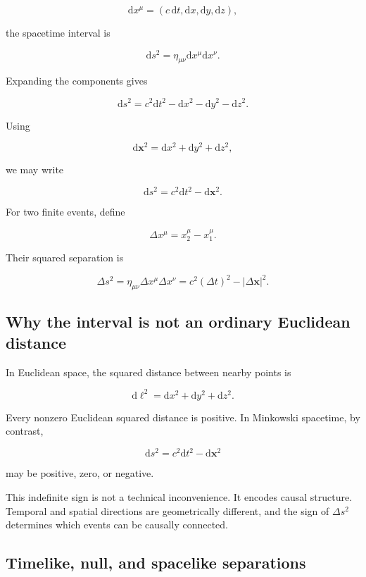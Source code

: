 \[
\mathrm{d}x^{\mu}
=
(c\,\mathrm{d}t,\mathrm{d}x,\mathrm{d}y,\mathrm{d}z),
\]

the spacetime interval is

\[
\boxed{
\mathrm{d}s^{2}
=
\eta_{\mu\nu}
\mathrm{d}x^{\mu}
\mathrm{d}x^{\nu}
}.
\]

Expanding the components gives

\[
\boxed{
\mathrm{d}s^{2}
=
c^{2}\mathrm{d}t^{2}
-
\mathrm{d}x^{2}
-
\mathrm{d}y^{2}
-
\mathrm{d}z^{2}
}.
\]

Using

\[
\mathrm{d}\mathbf{x}^{2}
=
\mathrm{d}x^{2}
+
\mathrm{d}y^{2}
+
\mathrm{d}z^{2},
\]

we may write

\[
\mathrm{d}s^{2}
=
c^{2}\mathrm{d}t^{2}
-
\mathrm{d}\mathbf{x}^{2}.
\]

For two finite events, define

\[
\Delta x^{\mu}
=
x_{2}^{\mu}-x_{1}^{\mu}.
\]

Their squared separation is

\[
\boxed{
\Delta s^{2}
=
\eta_{\mu\nu}
\Delta x^{\mu}
\Delta x^{\nu}
=
c^{2}(\Delta t)^{2}
-
|\Delta\mathbf{x}|^{2}
}.
\]

\subsection{Why the interval is not an ordinary Euclidean distance}

In Euclidean space, the squared distance between nearby points is

\[
\mathrm{d}\ell^{2}
=
\mathrm{d}x^{2}
+
\mathrm{d}y^{2}
+
\mathrm{d}z^{2}.
\]

Every nonzero Euclidean squared distance is positive. In Minkowski spacetime, by contrast,

\[
\mathrm{d}s^{2}
=
c^{2}\mathrm{d}t^{2}-\mathrm{d}\mathbf{x}^{2}
\]

may be positive, zero, or negative.

This indefinite sign is not a technical inconvenience. It encodes causal structure. Temporal and spatial directions are geometrically different, and the sign of \(\Delta s^{2}\) determines which events can be causally connected.

\subsection{Timelike, null, and spacelike separations}

